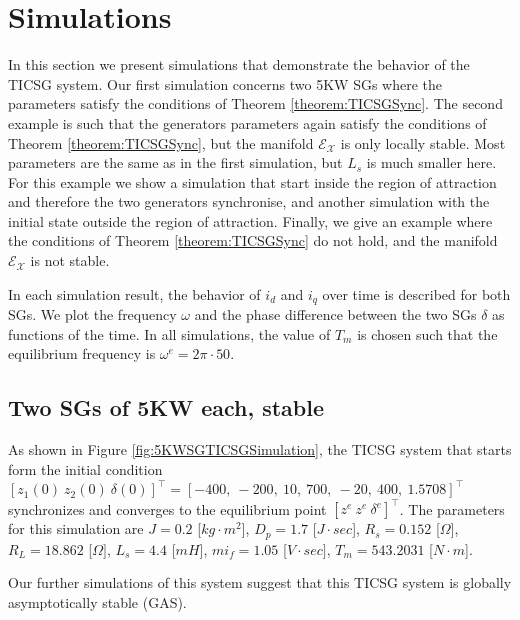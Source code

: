 \documentclass[letterpaper,10pt,conference]{ieeeconf}
\renewcommand{\o}    {{\omega}}
\newcommand{\Emscr}  {{\mathcal{E}}}
\newcommand{\Xmscr}  {{\mathcal{X}}}
\begin{document}
\section{Simulations} \label{sec7} %

In this section we present simulations that demonstrate the behavior
of the TICSG system. Our first simulation concerns two 5KW SGs where
the parameters satisfy the conditions of Theorem
\ref{theorem:TICSGSync}. The second example is such that the
generators parameters again satisfy the conditions of Theorem
\ref{theorem:TICSGSync}, but the manifold $\Emscr_\Xmscr$ is only
locally stable. Most parameters are the same as in the first
simulation, but $L_s$ is much smaller here. For this example we show
a simulation that start inside the region of attraction and therefore
the two generators synchronise, and another simulation with the 
initial state outside the region of attraction. Finally, we give an
example where the conditions of Theorem \ref{theorem:TICSGSync} do 
not hold, and the manifold $\Emscr_\Xmscr$ is not stable.

In each simulation result, the behavior of $i_d$ and $i_q$ over time
is described for both SGs. We plot the frequency $\o$ and the phase 
difference between the two SGs $\delta$ as functions of the time. In 
all simulations, the value of $T_m$ is chosen such that the 
equilibrium frequency is $\o^e=2\pi\cdot 50$.

\subsection{Two SGs of 5KW each, stable}

As shown in Figure \ref{fig:5KWSGTICSGSimulation}, the TICSG system
that starts form the initial condition $\left[z_1(0)\ z_2(0) \ 
\delta(0) \right]^\top = \left[ -400, \  -200,  \  10, \   700, \ -20, 
\  400, \ 1.5708 \right]^\top$ synchronizes and converges to the 
equilibrium point $\left[z^e\ z^e \ \delta^e \right]^\top$. The 
parameters for this simulation are $J=0.2$ {[}$kg\cdot m^{2}${]}, 
$D_p=1.7$ {[}$J\cdot sec${]}, $R_s=0.152$ {[}$\Omega]$, $R_L=18.862$ 
{[}$\Omega]$, $L_{s}=4.4$ {[}$mH${]}, $mi_{f}=1.05$ {[}$V\cdot sec]$, 
$T_m=543.2031$ {[}$N\cdot m${]}.

Our further simulations of this system suggest that this TICSG system 
is globally asymptotically stable (GAS).
\end{document}
